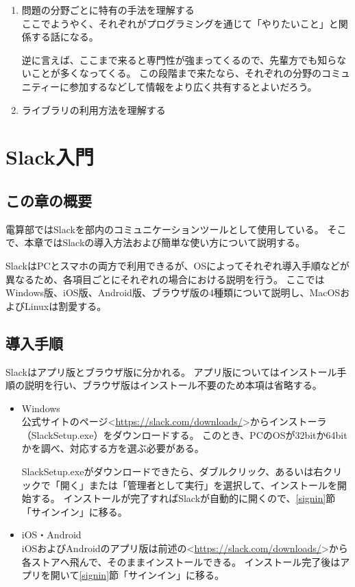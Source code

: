 \documentclass[lualatex,ja=standard,12pt,a4j]{bxjsbook}
\begin{document}
\begin{enumerate}
				\item 問題の分野ごとに特有の手法を理解する\\
                ここでようやく、それぞれがプログラミングを通じて「やりたいこと」と関係する話になる。
                
                逆に言えば、ここまで来ると専門性が強まってくるので、先輩方でも知らないことが多くなってくる。
                この段階まで来たなら、それぞれの分野のコミュニティーに参加するなどして情報をより広く共有するとよいだろう。
				
				\item ライブラリの利用方法を理解する\\
                
			\end{enumerate}
	\chapter{Slack入門}
		\section{この章の概要}
			電算部ではSlackを部内のコミュニケーションツールとして使用している。
            そこで、本章ではSlackの導入方法および簡単な使い方について説明する。
            
            SlackはPCとスマホの両方で利用できるが、OSによってそれぞれ導入手順などが異なるため、各項目ごとにそれぞれの場合における説明を行う。
            ここではWindows版、iOS版、Android版、ブラウザ版の4種類について説明し、MacOSおよびLinuxは割愛する。
            
        \section{導入手順}
        	Slackはアプリ版とブラウザ版に分かれる。
            アプリ版についてはインストール手順の説明を行い、ブラウザ版はインストール不要のため本項は省略する。
        	\begin{itemize} 
            	\item Windows\\
                	公式サイトのページ<\url{https://slack.com/downloads/}>からインストーラ（SlackSetup.exe）をダウンロードする。
                    このとき、PCのOSが32bitか64bitかを調べ、対応する方を選ぶ必要がある。
                    
                    SlackSetup.exeがダウンロードできたら、ダブルクリック、あるいは右クリックで「開く」または「管理者として実行」を選択して、インストールを開始する。
                	インストールが完了すればSlackが自動的に開くので、\ref{signin}節「サインイン」に移る。
                    
              	\item iOS・Android\\
                	iOSおよびAndroidのアプリ版は前述の<\url{https://slack.com/downloads/}>から各ストアへ飛んで、そのままインストールできる。
                    インストール完了後はアプリを開いて\ref{signin}節「サインイン」に移る。
                    
            \end{itemize}
\end{document}
